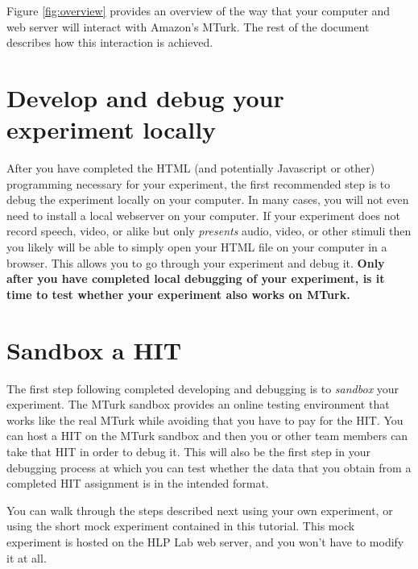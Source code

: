 \documentclass{article}
\begin{document}
Figure \ref{fig:overview} provides an overview of the way that your computer and web server will interact with Amazon's MTurk. The rest of the document describes how this interaction is achieved. 


\section{Develop and debug your experiment locally}

After you have completed the HTML (and potentially Javascript or other) programming necessary for your experiment, the first recommended step is to debug the experiment locally on your computer. In many cases, you will not even need to install a local webserver on your computer. If your experiment does not record speech, video, or alike but only {\em presents} audio, video, or other stimuli then you likely will be able to simply open your HTML file on your computer in a browser. This allows you to go through your experiment and debug it. \textbf{Only after you have completed local debugging of your experiment, is it time to test whether your experiment also works on MTurk.}



\section{Sandbox a HIT}

The first step following completed developing and debugging is to {\em sandbox} your experiment. The MTurk sandbox provides an online testing environment that works like the real MTurk while avoiding that you have to pay for the HIT. You can host a HIT on the MTurk sandbox and then you or other team members can take that HIT in order to debug it. This will also be the first step in your debugging process at which you can test whether the data that you obtain from a completed HIT assignment is in the intended format.

You can walk through the steps described next using your own experiment, or using the short mock experiment contained in this tutorial. This mock experiment is hosted on the HLP Lab web server, and you won't have to modify it at all.
\end{document}
